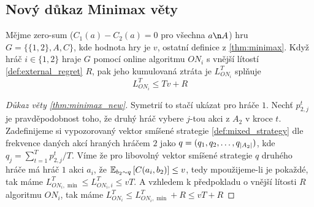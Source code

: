 \subsection{Nový důkaz Minimax věty}
\begin{theorem}
\label{thm:minimax_new}
Mějme zero-sum ($C_1(a) - C_2(a) = 0$ pro všechna $a \n A$) hru $G = \{\{1,2\}, A, C\}$, kde hodnota hry je $v$, ostatní definice z \ref{thm:minimax}. 
Když hráč $i\in \{1,2\}$ hraje $G$ pomocí online algoritmu $ON_i$ s vnější lítostí \ref{def:external_regret} $R$, pak jeho kumulovaná ztráta je $L_{ON_i}^T$ splňuje 
\[
    L_{ON_i}^T \leq Tv + R
\]
\end{theorem}

\begin{proof}[Důkaz věty \ref{thm:minimax_new}]
    Symetrií to stačí ukázat pro hráče $1$. 
    Nechť $p^t_{2,j}$ je pravděpodobnost toho, že druhý hráč vybere $j$-tou akci z $A_2$ v kroce $t$. 
    Zadefinijeme si vypozorovaný vektor smíšené strategie \ref{def:mixed_strategy} dle frekvence daných akcí hraných hráčem $2$ jako $q = (q_1,q_2,\dots,q_{\abs{A_2}})$, kde $q_j = \sum^T_{t=1} p^t_{2,j}/T$. Víme že pro libovolný vektor smíšené strategie $q$ druhého hráče má hráč $1$ akci $a_i$, že $\E[b_2\sim q]{C(a_i, b_2)} \leq v$, tedy mpoužijeme-li je pokaždé, tak máme $L^T_{ON_i,\min} \leq L^T_{ON_i,i} \leq vT$. 
    A vzhledem k předpokladu o vnější lítosti $R$ algoritmu $ON_i$, tak máme $L^T_{ON_i} \leq L^T_{ON_i,\min} + R \leq  vT +R$
\end{proof}

